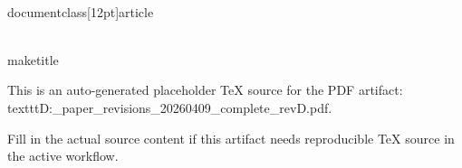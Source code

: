 ﻿\\documentclass[12pt]{article}
\begin{document}
\\maketitle

This is an auto-generated placeholder TeX source for the PDF artifact: \\texttt{D:\working_paper\DANNI\output\doc\main_revisions\main_20260409_complete_revD.pdf}.

Fill in the actual source content if this artifact needs reproducible TeX source in the active workflow.

\
\end{document}
